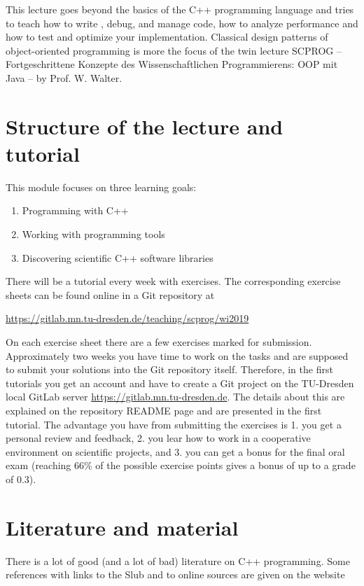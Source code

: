 This lecture goes beyond the basics of the C++ programming language and tries to teach how to write , debug, and manage code, how to analyze
performance and how to test and optimize your implementation. Classical design patterns of object-oriented programming is more the focus of
the twin lecture SCPROG -- Fortgeschrittene Konzepte des Wissenschaftlichen Programmierens: OOP mit Java -- by Prof. W. Walter.


\section{Structure of the lecture and tutorial}
This module focuses on three learning goals:
\begin{enumerate}[1)]
  \item Programming with C++
  \item Working with programming tools
  \item Discovering scientific C++ software libraries
\end{enumerate}

There will be a tutorial every week with exercises. The corresponding exercise sheets can be found online in a Git repository at

\url{https://gitlab.mn.tu-dresden.de/teaching/scprog/wi2019}

On each exercise sheet there are a few exercises marked for submission. Approximately two weeks you have time to work on the tasks
and are supposed to submit your solutions into the Git repository itself. Therefore, in the first tutorials you get an account and
have to create a Git project on the TU-Dresden local GitLab server \url{https://gitlab.mn.tu-dresden.de}. The details about this are
explained on the repository README page and are presented in the first tutorial. The advantage you have from submitting the exercises
is 1. you get a personal review and feedback, 2. you lear how to work in a cooperative environment on scientific projects, and 3. you
can get a bonus for the final oral exam (reaching 66\% of the possible exercise points gives a bonus of up to a grade of 0.3).


\section{Literature and material}
There is a lot of good (and a lot of bad) literature on C++ programming. Some references with links to the Slub and to online sources
are given on the website

